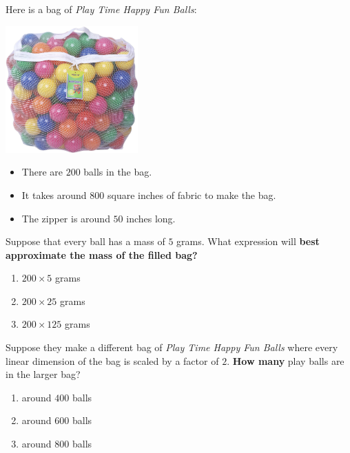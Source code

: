 \documentclass[handout,noauthor,nooutcomes]{ximera}
\author{Bart Snapp}
\begin{document}
\maketitle


Here is a bag of \textit{Play Time Happy Fun Balls}:
\begin{multicols}{2}
  \begin{center}
    \includegraphics[width=2in]{ballsInBag.jpg}
  \end{center}
  \begin{itemize}
  \item There are $200$ balls in the bag.
  \item It takes around $800$ square inches of fabric to make the bag.
  \item The zipper is around $50$ inches long.
  \end{itemize}
\end{multicols}






\begin{exercise}
  Suppose that every ball has a mass of $5$ grams.  What expression
  will \textbf{best approximate the mass of the filled bag?}
  \begin{multicols}{3}
    \begin{enumerate}
  \item $200\times5$ grams
  \item $200\times25$ grams
  \item $200\times125$ grams
    \end{enumerate}
  \end{multicols}
\end{exercise}



\begin{exercise}
  Suppose they make a different bag of \textit{Play Time Happy Fun
    Balls} where every linear dimension of the bag is scaled by a
  factor of $2$.  \textbf{How many} play balls are in the larger bag?
  \begin{multicols}{3}
    \begin{enumerate}
  \item around $400$ balls
  \item around $600$ balls
  \item around $800$ balls
    \end{enumerate}
  \end{multicols}
\end{exercise}
\end{document}
